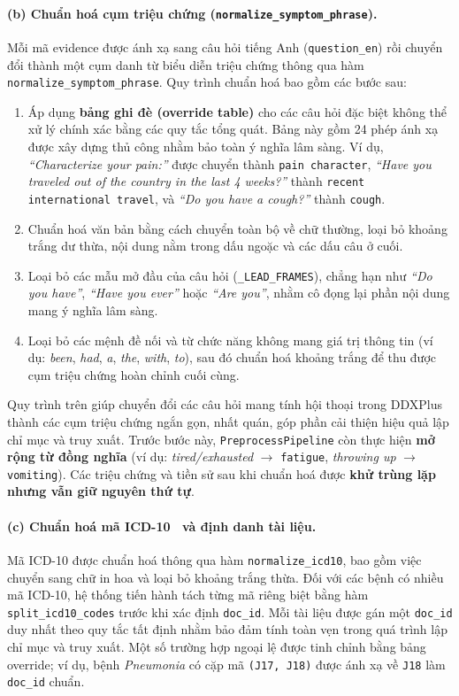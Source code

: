\paragraph{(b) Chuẩn hoá cụm triệu chứng (\texttt{normalize\_symptom\_phrase}).}
Mỗi mã evidence được ánh xạ sang câu hỏi tiếng Anh (\texttt{question\_en}) rồi chuyển đổi thành một cụm danh từ biểu diễn triệu chứng thông qua hàm \texttt{normalize\_symptom\_phrase}. Quy trình chuẩn hoá bao gồm các bước sau:
\begin{enumerate}[leftmargin=1.4em,itemsep=2pt]
    \item Áp dụng \textbf{bảng ghi đè (override table)} cho các câu hỏi đặc biệt không thể xử lý chính xác bằng các quy tắc tổng quát. Bảng này gồm 24 phép ánh xạ được xây dựng thủ công nhằm bảo toàn ý nghĩa lâm sàng. Ví dụ, \textit{``Characterize your pain:''} được chuyển thành \texttt{pain character}, \textit{``Have you traveled out of the country in the last 4 weeks?''} thành \texttt{recent international travel}, và \textit{``Do you have a cough?''} thành \texttt{cough}.
    \item Chuẩn hoá văn bản bằng cách chuyển toàn bộ về chữ thường, loại bỏ khoảng trắng dư thừa, nội dung nằm trong dấu ngoặc và các dấu câu ở cuối.
    \item Loại bỏ các mẫu mở đầu của câu hỏi (\texttt{\_LEAD\_FRAMES}), chẳng hạn như \textit{``Do you have''}, \textit{``Have you ever''} hoặc \textit{``Are you''}, nhằm cô đọng lại phần nội dung mang ý nghĩa lâm sàng.
    \item Loại bỏ các mệnh đề nối và từ chức năng không mang giá trị thông tin (ví dụ: \textit{been}, \textit{had}, \textit{a}, \textit{the}, \textit{with}, \textit{to}), sau đó chuẩn hoá khoảng trắng để thu được cụm triệu chứng hoàn chỉnh cuối cùng.
\end{enumerate}
Quy trình trên giúp chuyển đổi các câu hỏi mang tính hội thoại trong DDXPlus thành các cụm triệu chứng ngắn gọn, nhất quán, góp phần cải thiện hiệu quả lập chỉ mục và truy xuất. Trước bước này, \texttt{PreprocessPipeline} còn thực hiện \textbf{mở rộng từ đồng nghĩa} (ví dụ: \textit{tired/exhausted} $\rightarrow$ \texttt{fatigue}, \textit{throwing up} $\rightarrow$ \texttt{vomiting}). Các triệu chứng và tiền sử sau khi chuẩn hoá được \textbf{khử trùng lặp nhưng vẫn giữ nguyên thứ tự}.

\paragraph{(c) Chuẩn hoá mã ICD-10~\cite{who2019icd10} và định danh tài liệu.}
Mã ICD-10 được chuẩn hoá thông qua hàm \texttt{normalize\_icd10}, bao gồm việc chuyển sang chữ in hoa và loại bỏ khoảng trắng thừa. Đối với các bệnh có nhiều mã ICD-10, hệ thống tiến hành tách từng mã riêng biệt bằng hàm \texttt{split\_icd10\_codes} trước khi xác định \texttt{doc\_id}. Mỗi tài liệu được gán một \texttt{doc\_id} duy nhất theo quy tắc tất định nhằm bảo đảm tính toàn vẹn trong quá trình lập chỉ mục và truy xuất. Một số trường hợp ngoại lệ được tinh chỉnh bằng bảng override; ví dụ, bệnh \textit{Pneumonia} có cặp mã \texttt{(J17, J18)} được ánh xạ về \texttt{J18} làm \texttt{doc\_id} chuẩn.

